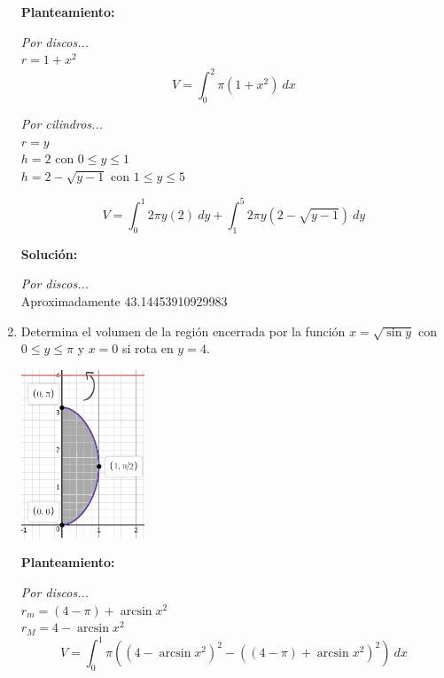 \documentclass[10pt,letterpaper]{article}
\begin{document}
\begin{enumerate}
\begin{multicols}{2}

\textbf{Planteamiento:}

\textit{Por discos...} \\
$r = 1+x^2$ \\
$$V = \int_{0}^{2} \pi (1+x^2)\ dx$$

\textit{Por cilindros...} \\
$r = y$ \\
$h = 2$ con $0 \leq y \leq 1$ \\
$h = 2 - \sqrt{y-1}$ con $1 \leq y \leq 5$

$$V = \int_{0}^{1} 2\pi y (2)\ dy + \int_{1}^{5} 2\pi y (2-\sqrt{y-1})\ dy$$

\textbf{Solución:}

\textit{Por discos...} \\
Aproximadamente 43.14453910929983

\end{multicols}

\item Determina el volumen de la región encerrada por la función $x = \sqrt{\sin y}$ con
      $0 \leq y \leq \pi$ y $x = 0$ si rota en $y = 4$.

\begin{multicols}{2}

\includegraphics[height=5cm]{Images/grafica5.png}

\textbf{Planteamiento:}

\textit{Por discos...} \\
$r_m = (4-\pi) + \arcsin{x^2}$ \\
$r_M = 4 - \arcsin{x^2}$
$$V = \int_{0}^{1} \pi ( (4 - \arcsin{x^2})^2 - ((4-\pi) + \arcsin{x^2})^2 ) \ dx$$


\end{multicols}
\end{enumerate}
\end{document}
